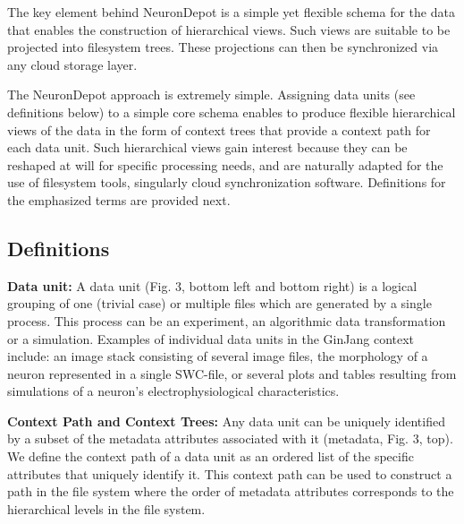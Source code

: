 \documentclass{frontiersSCNS} %
\begin{document}
The key element behind NeuronDepot is a simple yet flexible schema for the data
that enables the construction of  hierarchical views. Such views are suitable
to be projected into filesystem trees. These projections can then be
synchronized via any cloud storage layer. 

The NeuronDepot approach is extremely simple. Assigning data units (see
definitions below) to a simple core schema enables to produce flexible
hierarchical views of the data in the form of context trees that provide a
context path for each data unit. Such hierarchical views gain interest because
they can be reshaped at will for specific processing needs, and are naturally
adapted for the use of filesystem tools, singularly cloud synchronization
software. Definitions for the emphasized terms are provided next.


\subsection{Definitions}

\textbf{Data unit:} A data unit (Fig. 3, bottom left and  bottom right) is a
logical grouping of one (trivial case) or multiple files which are generated by
a single process. This process can be an experiment, an algorithmic data
transformation or a simulation. Examples of individual data units in the
GinJang context include: an image stack consisting of several image files, the
morphology of a neuron represented in a single SWC-file, or several plots and
tables resulting from simulations of a neuron's electrophysiological
characteristics.

\textbf{Context Path and Context Trees:} Any data unit can be uniquely
identified by a subset of the metadata attributes associated with it (metadata,
Fig. 3, top). We define the context path of a data unit as an ordered list of
the specific attributes that uniquely identify it. This context path can be
used to construct a path in the file system where the order of metadata
attributes corresponds to the hierarchical levels in the file system. 
\end{document}
